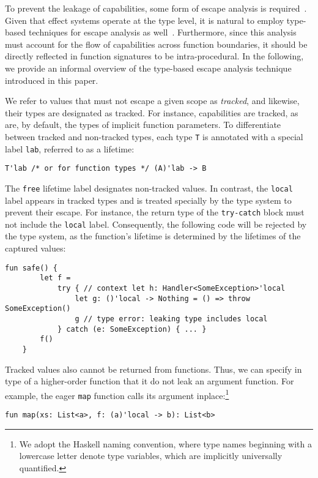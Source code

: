 \documentclass[acmsmall,review,screen]{acmart}
\begin{document}
To prevent the leakage of capabilities, some form of escape analysis is required~\cite{park1992escape}.
Given that effect systems operate at the type level, it is natural to employ type-based techniques for escape analysis as well~\cite{xie2022first}. %
Furthermore, since this analysis must account for the flow of capabilities across function boundaries, it should be directly reflected in function signatures to be intra-procedural.
In the following, we provide an informal overview of the type-based escape analysis technique introduced in this paper.

We refer to values that must not escape a given scope as \textit{tracked}, and likewise, their types are designated as tracked.
For instance, capabilities are tracked, as are, by default, the types of implicit function parameters.
To differentiate between tracked and non-tracked types, each type \lstinline[language=colang]|T| is annotated with a special label \lstinline[language=colang]|lab|, referred to as a lifetime:
\begin{lstlisting}[language=colang]
    T'lab /* or for function types */ (A)'lab -> B
\end{lstlisting}

The \lstinline[language=colang]|free| lifetime label designates non-tracked values.
In contrast, the \lstinline[language=colang]|local| label appears in tracked types and is treated specially by the type system to prevent their escape.
For instance, the return type of the \lstinline[language=colang]|try-catch| block must not include the \lstinline[language=colang]|local| label.
Consequently, the following code will be rejected by the type system, as the function’s lifetime is determined by the lifetimes of the captured values:
\begin{lstlisting}[language=colang]
    fun safe() {
        let f =
            try { // context let h: Handler<SomeException>'local
                let g: ()'local -> Nothing = () => throw SomeException()
                g // type error: leaking type includes local
            } catch (e: SomeException) { ... }
        f()
    }
\end{lstlisting}

Tracked values also cannot be returned from functions.
Thus, we can specify in type of a higher-order function that it do not leak an argument function.
For example, the eager \lstinline[language=colang]|map| function calls its argument inplace:\footnote{We adopt the Haskell naming convention, where type names beginning with a lowercase letter denote type variables, which are implicitly universally quantified.}
\begin{lstlisting}[language=colang]
    fun map(xs: List<a>, f: (a)'local -> b): List<b>
\end{lstlisting}
\end{document}
